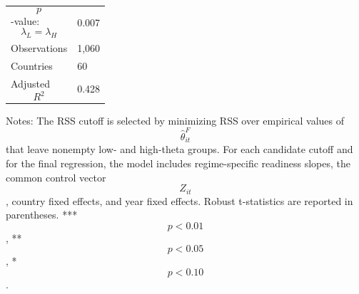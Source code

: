 \begin{table}[H]
\begin{threeparttable}
\begin{tabularx}{\textwidth}{lY}
$$p$$-value: $$\lambda_L=\lambda_H$$ & 0.007 \\
Observations & 1,060 \\
Countries & 60 \\
Adjusted $$R^2$$ & 0.428 \\
\bottomrule
\end{tabularx}
\begin{tablenotes}[flushleft]\footnotesize
\item Notes: The RSS cutoff is selected by minimizing RSS over empirical values of $$\widehat{\theta}^{F}_{it}$$ that leave nonempty low- and high-theta groups. For each candidate cutoff and for the final regression, the model includes regime-specific readiness slopes, the common control vector $$Z_{it}$$, country fixed effects, and year fixed effects. Robust t-statistics are reported in parentheses. *** $$p<0.01$$, ** $$p<0.05$$, * $$p<0.10$$.
\end{tablenotes}
\end{threeparttable}
\end{table}
